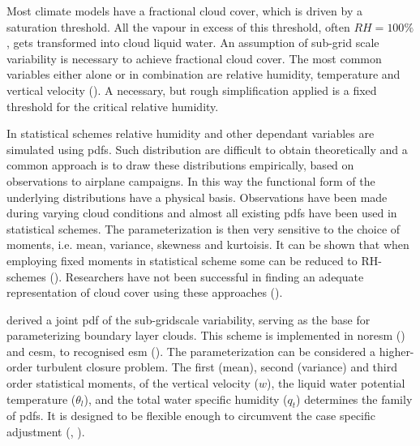 Most climate models have a fractional cloud cover, which is driven by a saturation threshold. All the vapour in excess of this threshold, often $RH=100\%$, gets transformed into cloud liquid water. An assumption of sub-grid scale variability is necessary to achieve fractional cloud cover. %
The most common variables either alone or in combination are relative humidity, temperature and vertical velocity (\cite{Golaz2002_part1}). A necessary, but rough simplification applied is a fixed threshold for the critical relative humidity. 

In statistical schemes relative humidity and other dependant variables are simulated using \acrlong{pdf}s. Such distribution are difficult to obtain theoretically and a common approach is to draw these distributions empirically, based on observations to airplane campaigns. In this way the functional form of the underlying distributions have a physical basis. Observations have been made during varying cloud conditions and almost all existing \acrshort{pdf}s have been used in statistical schemes. The parameterization is then very sensitive to the choice of moments, i.e. mean, variance, skewness and kurtoisis. It can be shown that when employing fixed moments in statistical scheme some can be reduced to RH-schemes (\cite{Tomkins2005}). Researchers have not been successful in finding an adequate representation of cloud cover using these approaches (\cite{Tompkins2009CloudParametrization}). 


 derived a joint \acrshort{pdf} of the sub-gridscale variability, serving as the base for parameterizing boundary layer clouds. This scheme is implemented in \acrfull{noresm} (\cite{SelandNORESM}) and \acrfull{cesm}, to recognised \acrshort{esm} (\cite{DanabasogluCESM}). The parameterization can be considered a higher-order turbulent closure problem. The first (mean), second (variance) and third order statistical moments, of the vertical velocity ($w$), the liquid water potential temperature ($\theta_l$), and the total water specific humidity ($q_t$) determines the family of \acrshort{pdf}s. It is designed to be flexible enough to %
circumvent the case specific adjustment (\cite{Golaz2002_part1},  \cite{Golaz2002_part2}). 

